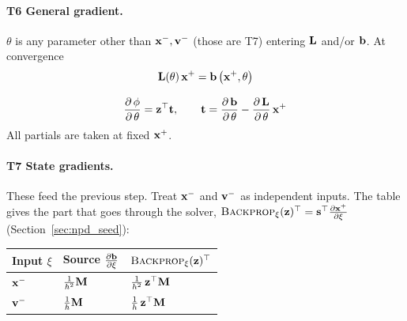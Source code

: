\paragraph{T6 General gradient.}\mbox{}
\newline $\theta$ is any parameter other than $\mathbf{x}^-, \mathbf{v}^-$ (those are T7) entering $\mathbf{L}$ and/or $\mathbf{b}$. At convergence
\begin{equation*}
    \mathbf{L}(\theta)\,\mathbf{x}^+ = \mathbf{b}\left(\mathbf{x}^+, \theta\right)
\end{equation*}

\begin{equation}
\label{eq:npd_v1_general_gradient}
    \dfrac{\partial\, \phi}{\partial\, \theta} = \mathbf{z}^\top\mathbf{t},
    \qquad
    \mathbf{t} = \dfrac{\partial\, \mathbf{b}}{\partial\, \theta} - \dfrac{\partial\, \mathbf{L}}{\partial\, \theta}\,\mathbf{x}^+
\end{equation}
\noindent All partials are taken at fixed $\mathbf{x}^+$.

\paragraph{T7 State gradients.}\mbox{}
\newline These feed the previous step. Treat $\mathbf{x}^-$ and $\mathbf{v}^-$ as independent inputs. The table gives the part that goes through the solver, $\textsc{Backprop}_\xi(\mathbf{z})^\top = \mathbf{s}^\top\frac{\partial \mathbf{x}^+}{\partial \xi}$ (Section~\ref{sec:npd_seed}):
\begin{center}
\renewcommand{\arraystretch}{1.6}
\begin{tabular}{lll}
\textbf{Input} $\xi$ & \textbf{Source} $\frac{\partial \mathbf{b}}{\partial \xi}$ & $\textsc{Backprop}_\xi(\mathbf{z})^\top$ \\ \hline
$\mathbf{x}^-$ & $\tfrac{1}{h^2}\mathbf{M}$ & $\tfrac{1}{h^2}\,\mathbf{z}^\top\mathbf{M}$ \\
$\mathbf{v}^-$ & $\tfrac{1}{h}\mathbf{M}$ & $\tfrac{1}{h}\,\mathbf{z}^\top\mathbf{M}$ \\
\end{tabular}
\end{center}

